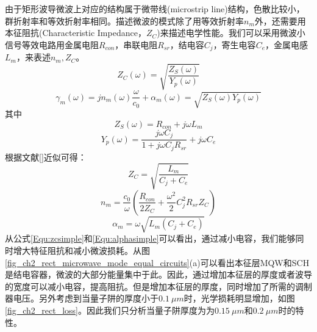 由于矩形波导微波上对应的结构属于微带线(microstrip  line)结构，色散比较小，群折射率和等效折射率相同。描述微波的模式除了用等效折射率$n_m$外，还需要用本征阻抗(Characteristic Impedance，$Z_C$)来描述电学性能。我们可以采用微波小信号等效电路用金属电阻$R_{con}$，串联电阻$R_{sr}$，结电容$C_j$，寄生电容$C_e$，金属电感$L_m$，来表述$n_m, Z_C$。
\begin{equation}
\label{Equ:zc}
Z_C(\omega) = \sqrt{\frac{Z_S(\omega)}{Y_p(\omega)}}
\end{equation}
\begin{equation}
\label{Equ:gammam}
\gamma_m(\omega) = jn_m(\omega)\frac{\omega}{c_0} + \alpha_m(\omega) = \sqrt{Z_S(\omega)Y_p(\omega)}
\end{equation}
其中
\begin{equation}
\label{Equ:zs}
Z_S(\omega) = R_{con}+j\omega L_m
\end{equation}
\begin{equation}
\label{Equ:yp}
Y_p(\omega) = \frac{j\omega C_j}{1+j\omega C_jR_{sr}}+j\omega C_e
\end{equation}
根据文献[]近似可得：
\begin{equation}
\label{Equ:zcsimple}
Z_C = \sqrt{\frac{L_m}{C_j+C_e}}
\end{equation}
\begin{equation}
\label{Equ:nmsimple}
n_m = \frac{c_0}{\omega}\left(\frac{R_{con}}{2Z_C} + \frac{\omega^2}{2}C^2_jR_{sr}Z_C\right)
\end{equation}
\begin{equation}
\label{Equ:alphasimple}
\alpha_m = \omega\sqrt{L_m(C_j+C_e)}
\end{equation}
从公式\ref{Equ:zcsimple}和\ref{Equ:alphasimple}可以看出，通过减小电容，我们能够同时增大特征阻抗和减小微波损耗。从图\ref{fig_ch2_rect_microwave_mode_equal_circuits}(a)可以看出本征层MQW和SCH是结电容器，微波的大部分能量集中于此。因此，通过增加本征层的厚度或者波导的宽度可以减小电容，提高阻抗。但是增加本征层的厚度，同时增加了所需的调制器电压。另外考虑到当量子阱的厚度小于$0.1 ~\mu m$时，光学损耗明显增加，如图\ref{fig_ch2_rect_loss}。因此我们只分析当量子阱厚度为为$0.15~ \mu m$和$0.2 ~\mu m$时的特性。
